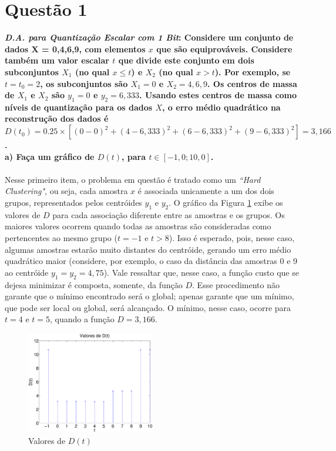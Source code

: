 \documentclass{report}
\begin{document}


\section*{Questão 1}

\textbf{\textit{D.A. para Quantização Escalar com 1 Bit}: Considere um conjunto de dados X = {0,4,6,9}, com elementos $x$ que são equiprováveis. Considere também um valor escalar $t$ que divide este conjunto em dois subconjuntos $X_1$ (no qual $x \leq t$) e $X_2$ (no qual $x > t$). Por exemplo, se $t = t_0 = 2$, os subconjuntos são $X_1 = {0}$ e $X_2 = {4, 6, 9}$. Os centros de massa de $X_1$ e $X_2$ são $y_1 = 0$ e $y_2 = 6,333$. Usando estes centros de massa como níveis de quantização para os dados $X$, o erro médio quadrático na reconstrução dos dados é $D(t_0) = 0.25 \times [(0-0)^2 + (4-6,333)^2 + (6-6,333)^2 + (9-6,333)^2] = 3,166$.}\\

\textbf{a) Faça um gráfico de $D(t)$, para $t \in [-1,0; 10,0]$.}\\

\paragraph{} Nesse primeiro item, o problema em questão é tratado como um \emph{``Hard Clustering"}, ou seja, cada amostra $x$ é associada unicamente a um dos dois grupos, representados pelos centróides $y_1$ e $y_2$. O gráfico da Figura \ref{grafico_distorcao} exibe os valores de $D$ para cada associação diferente entre as amostras e os grupos. Os maiores valores ocorrem quando todas as amostras são consideradas como pertencentes ao mesmo grupo ($t = -1$ e $t > 8$). Isso é esperado, pois, nesse caso, algumas amostras estarão muito distantes do centróide, gerando um erro médio quadrático maior (considere, por exemplo, o caso da distância das amostras 0 e 9 ao centróide $y_1 = y_2 = 4,75$). Vale ressaltar que, nesse caso, a função custo que se dejesa minimizar é composta, somente, da função $D$. Esse procedimento não garante que o mínimo encontrado será o global; apenas garante que um mínimo, que pode ser local ou global, será alcançado. O mínimo, nesse caso, ocorre para $t = 4$ e $t = 5$, quando a função $D = 3,166$.\\

\begin{figure}[H]
	\centering
	\includegraphics[width = 0.5\textwidth]{Q1_A_distorcao}
	\caption{Valores de $D(t)$}
	\label{grafico_distorcao}
\end{figure}
\end{document}
